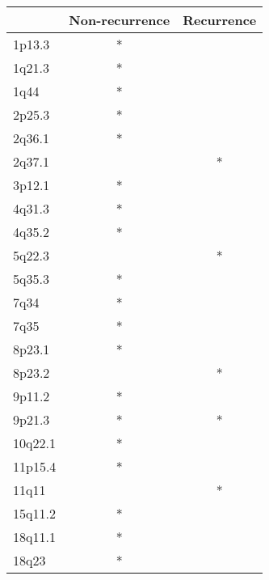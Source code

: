 \begin{tabular}{lcc}
\toprule
{} & Non-recurrence & Recurrence \\
\midrule
1p13.3  &              * &            \\
1q21.3  &              * &            \\
1q44    &              * &            \\
2p25.3  &              * &            \\
2q36.1  &              * &            \\
2q37.1  &                &          * \\
3p12.1  &              * &            \\
4q31.3  &              * &            \\
4q35.2  &              * &            \\
5q22.3  &                &          * \\
5q35.3  &              * &            \\
7q34    &              * &            \\
7q35    &              * &            \\
8p23.1  &              * &            \\
8p23.2  &                &          * \\
9p11.2  &              * &            \\
9p21.3  &              * &          * \\
10q22.1 &              * &            \\
11p15.4 &              * &            \\
11q11   &                &          * \\
15q11.2 &              * &            \\
18q11.1 &              * &            \\
18q23   &              * &            \\
\bottomrule
\end{tabular}
